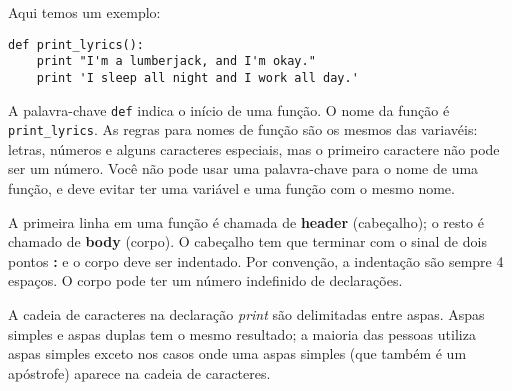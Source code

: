 Aqui temos um exemplo:

\beforeverb
\begin{verbatim}
def print_lyrics():
    print "I'm a lumberjack, and I'm okay."
    print 'I sleep all night and I work all day.'
\end{verbatim}
\afterverb
%

A palavra-chave {\tt def} indica o início de uma função. O nome da função
é \verb"print_lyrics". As regras para nomes de função são os mesmos das
variavéis: letras, números e alguns caracteres especiais, mas o primeiro
caractere não pode ser um número. Você não pode usar uma palavra-chave
para o nome de uma função, e deve evitar ter uma variável e uma função
com o mesmo nome.





A primeira linha em uma função é chamada de {\bf header} (cabeçalho); o
resto é chamado de {\bf body} (corpo). O cabeçalho tem que terminar com
o sinal de dois pontos {\bf :} e o corpo deve ser indentado. Por convenção,
a indentação são sempre 4 espaços. O corpo pode ter um número indefinido de
declarações.



A cadeia de caracteres na declaração {\it print} são delimitadas entre
aspas. Aspas simples e aspas duplas tem o mesmo resultado; a maioria das
pessoas utiliza aspas simples exceto nos casos onde uma aspas simples
(que também é um apóstrofe) aparece na cadeia de caracteres.

